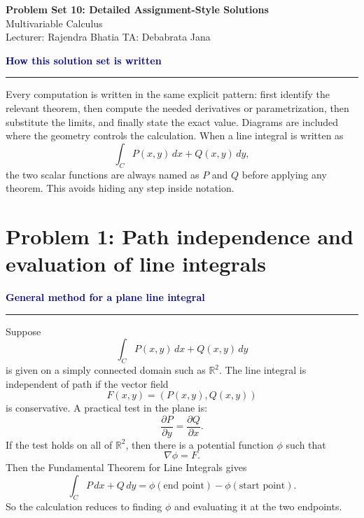\documentclass[11pt,a4paper]{article}
\newenvironment{methodbox}[1]{%
  \par\medskip
  \noindent\textcolor{navy}{\bfseries #1}\par
  \noindent\textcolor{navy}{\rule{\linewidth}{0.55pt}}\par\smallskip
}{\par\medskip}
\newcommand{\R}{\mathbb{R}}
\newcommand{\pd}[2]{\frac{\partial #1}{\partial #2}}
\newcommand{\grad}{\nabla}
\begin{document}
\begin{center}
    {\Large\bfseries Problem Set 10: Detailed Assignment-Style Solutions}\\[0.35em]
    {\large Multivariable Calculus}\\[0.25em]
    {\small Lecturer: Rajendra Bhatia \quad TA: Debabrata Jana}
\end{center}

\begin{methodbox}{How this solution set is written}
Every computation is written in the same explicit pattern: first identify the relevant theorem, then compute the needed derivatives or parametrization, then substitute the limits, and finally state the exact value.  Diagrams are included where the geometry controls the calculation.  When a line integral is written as
\[
\int_C P(x,y)\,dx+Q(x,y)\,dy,
\]
the two scalar functions are always named as \(P\) and \(Q\) before applying any theorem.  This avoids hiding any step inside notation.
\end{methodbox}

\tableofcontents
\newpage

\section{Problem 1: Path independence and evaluation of line integrals}

\begin{methodbox}{General method for a plane line integral}
Suppose
\[
\int_C P(x,y)\,dx+Q(x,y)\,dy
\]
is given on a simply connected domain such as \(\R^2\).  The line integral is independent of path if the vector field
\[
F(x,y)=(P(x,y),Q(x,y))
\]
is conservative.  A practical test in the plane is:
\[
\pd{P}{y}=\pd{Q}{x}.
\]
If the test holds on all of \(\R^2\), then there is a potential function \(\phi\) such that
\[
\grad \phi=F.
\]
Then the Fundamental Theorem for Line Integrals gives
\[
\int_C P\,dx+Q\,dy=\phi(\text{end point})-\phi(\text{start point}).
\]
So the calculation reduces to finding \(\phi\) and evaluating it at the two endpoints.
\end{methodbox}
\end{document}
